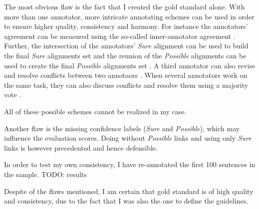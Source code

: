 The most obvious flaw is the fact that I created the gold standard alone. 
With more than one annotator, more intricate annotating schemes can be used in order to ensure higher quality, consistency and harmony. 
For instance the annotators' agreement can be measured using the so-called inner-annotator agreement \autocite{holmqvist-ahrenberg-2011-gold}. 
Further, the intersection of the annotators' \emph{Sure} alignment can be used to build the final \emph{Sure} alignments set and the reunion of the \emph{Possible} alignments can be used to create the final \emph{Possible} alignments set \cite{mihalcea-pedersen-2003-evaluation}.
A third annotator can also revise and resolve conflicts between two annotaors \cite{mihalcea-pedersen-2003-evaluation}.
When several annotators work on the same task, they can also discuss conflicts and resolve them using a majority vote \autocite{DBLP:journals/corr/cmp-lg-9805004}.

All of these possible schemes cannot be realized in my case.

Another flaw is the missing confidence labels (\emph{Sure} and \emph{Possible}), which may influence the evaluation scores. 
Doing without \emph{Possible} links and using only \emph{Sure} links is however precedented \autocites{clematide2018,mihalcea-pedersen-2003-evaluation} and hence defensible.

In order to test my own consistency, I have re-annotated the first 100 sentences in the sample. 
TODO: results

Despite of the flaws mentioned, I am certain that gold standard is of high quality and consistency, due to the fact that I was also the one to define the guidelines.

